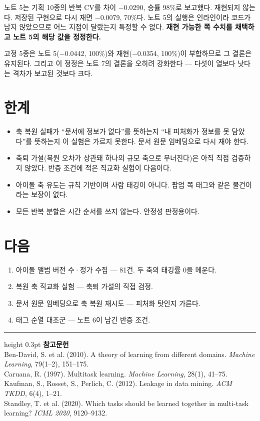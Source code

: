 \documentclass[10pt]{article}
\begin{document}
노트 5는 기획 10종의 반복 CV를 차이 $-$0.0290, 승률 98\%로 보고했다. 재현되지
않는다. 저장된 구현으로 다시 재면 $-$0.0079, 70\%다. 노트 5의 실행은 인라인이라
코드가 남지 않았으므로 어느 지점이 달랐는지 특정할 수 없다. \textbf{재현 가능한
쪽 수치를 채택하고 노트 5의 해당 값을 정정한다.}

고정 5종은 노트 5($-$0.0442, 100\%)와 재현($-$0.0354, 100\%)이 부합하므로
그 결론은 유지된다. 그리고 이 정정은 노트 7의 결론을 오히려 강화한다 --- 다섯이
열보다 낫다는 격차가 보고된 것보다 크다.

\section{한계}

\begin{itemize}[leftmargin=1.1em,itemsep=0.15em]
\item 축 복원 실패가 ``문서에 정보가 없다''를 뜻하는지 ``내 피처화가 정보를
      못 담았다''를 뜻하는지 이 실험은 가르지 못한다. 문서 원문 임베딩으로
      다시 재야 한다.
\item 축퇴 가설(복원 오차가 상관돼 하나의 규모 축으로 무너진다)은 아직 직접
      검증하지 않았다. 반증 조건에 적은 직교화 실험이 다음이다.
\item 아이돌 축 유도는 규칙 기반이며 사람 태깅이 아니다. 팝업 쪽 태그와 같은
      물건이라는 보장이 없다.
\item 모든 반복 분할은 시간 순서를 쓰지 않는다. 안정성 판정용이다.
\end{itemize}

\section{다음}

\begin{enumerate}[leftmargin=1.3em,itemsep=0.15em]
\item 아이돌 앨범 버전 수·정가 수집 --- 81건. 두 축의 태깅률 0을 메운다.
\item 복원 축 직교화 실험 --- 축퇴 가설의 직접 검정.
\item 문서 원문 임베딩으로 축 복원 재시도 --- 피처화 탓인지 가른다.
\item 태그 순열 대조군 --- 노트 6이 남긴 반증 조건.
\end{enumerate}

\vspace{0.6em}
\hrule height 0.3pt
\vspace{0.5em}
{\footnotesize
\textbf{참고문헌}\\[0.3em]
Ben-David, S. et al. (2010). A theory of learning from different domains.
\emph{Machine Learning}, 79(1--2), 151--175.\\[0.15em]
Caruana, R. (1997). Multitask learning. \emph{Machine Learning}, 28(1), 41--75.\\[0.15em]
Kaufman, S., Rosset, S., Perlich, C. (2012). Leakage in data mining.
\emph{ACM TKDD}, 6(4), 1--21.\\[0.15em]
Standley, T. et al. (2020). Which tasks should be learned together in multi-task
learning? \emph{ICML 2020}, 9120--9132.
}
\end{document}
